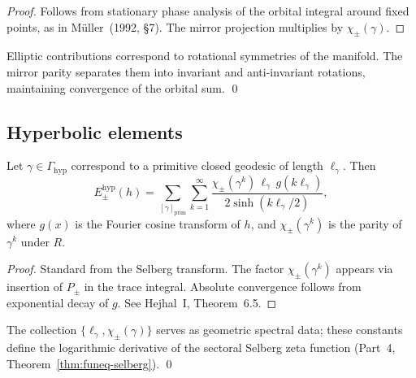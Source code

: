 \begin{proof}
Follows from stationary phase analysis of the orbital integral around fixed points, as in Müller~(1992, §7). The mirror projection multiplies by $\chi_\pm(\gamma)$.  %
\end{proof}

\begin{remark}
\label{rem:elliptic-geom}
Elliptic contributions correspond to rotational symmetries of the manifold. The mirror parity separates them into invariant and anti-invariant rotations, maintaining convergence of the orbital sum. \qed {} %
\end{remark}


\subsection{Hyperbolic elements}
\label{subsec:ch6-part5-hyperbolic} \relax \hspace{0pt}
\begin{theorem}
\label{thm:hyperbolic-term}
Let $\gamma\in\Gamma_{\mathrm{hyp}}$ correspond to a primitive closed geodesic of length $\ell_\gamma$. Then
\[
E_\pm^{\mathrm{hyp}}(h)
=\sum_{[\gamma]_{\mathrm{prim}}}\sum_{k=1}^\infty
\frac{\chi_\pm(\gamma^k)\,\ell_\gamma\,g(k\ell_\gamma)}{2\sinh(k\ell_\gamma/2)},
\]
where $g(x)$ is the Fourier cosine transform of $h$, and $\chi_\pm(\gamma^k)$ is the parity of $\gamma^k$ under $R$.  %
\end{theorem}

\begin{proof}
Standard from the Selberg transform. The factor $\chi_\pm(\gamma^k)$ appears via insertion of $P_\pm$ in the trace integral. Absolute convergence follows from exponential decay of $g$. See Hejhal~I, Theorem~6.5.  %
\end{proof}

\begin{remark}
\label{rem:hyperbolic-ledger}
The collection $\{\ell_\gamma,\chi_\pm(\gamma)\}$ serves as geometric spectral data; these constants define the logarithmic derivative of the sectoral Selberg zeta function (Part~4, Theorem~\ref{thm:funeq-selberg}). \qed {} %
\end{remark}

